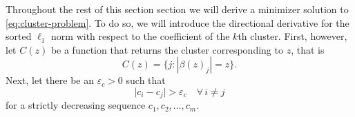 
Throughout the rest of this section section we will derive a minimizer solution to
\eqref{eq:cluster-problem}. To do so, we will introduce the directional derivative for the
sorted \(\ell_1\) norm with respect to the coefficient of the \(k\)th cluster. First,
however, let \(C(z)\) be a function that returns the cluster corresponding to \(z\), that is
\[
  C(z) = \{j : |\beta(z)_j| = z\}.
\]
Next, let there be an \({\varepsilon_c} > 0\) such that
\begin{equation}
  \label{eq:epsilon-c}
  \big| c_i - c_j\big| > {\varepsilon_c} \quad \forall\, i \neq j
\end{equation}
for a strictly decreasing sequence \(c_1, c_2, ..., c_m\).

